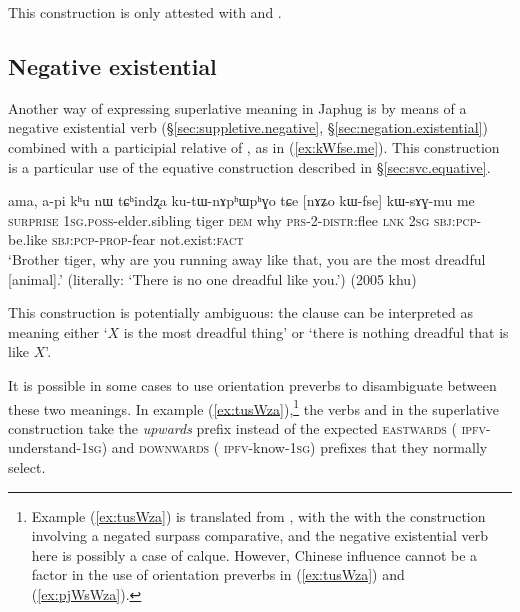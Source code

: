 This construction is only attested with  and .

 \subsection{Negative existential} \label{sec:negative.existential.superlative}
 
Another way of expressing superlative meaning in Japhug is by means of a negative existential verb (§\ref{sec:suppletive.negative}, §\ref{sec:negation.existential}) combined with a participial relative of , as in (\ref{ex:kWfse.me}). This construction is a particular use of the equative construction described in §\ref{sec:svc.equative}.


 \begin{exe}
\ex \label{ex:kWfse.me}
\gll ama, a-pi kʰu nɯ tɕʰindʐa ku-tɯ-nɤpʰɯpʰɣo tɕe [nɤʑo kɯ-fse] kɯ-sɤɣ-mu me	\\
\textsc{surprise} \textsc{1sg}.\textsc{poss}-elder.sibling tiger \textsc{dem} why \textsc{prs}-2-\textsc{distr}:flee \textsc{lnk} \textsc{2sg}  \textsc{sbj}:\textsc{pcp}-be.like   \textsc{sbj}:\textsc{pcp}-\textsc{prop}-fear  not.exist:\textsc{fact} \\
\glt `Brother tiger, why are you running away like that, you are the most dreadful [animal].' (literally: `There is no one dreadful like you.') (2005 khu)
\end{exe}

This construction is potentially ambiguous: the clause  can be interpreted as meaning either  `$X$ is the most dreadful thing' or `there is nothing dreadful that is like $X$'. 

It is possible in some cases to use orientation preverbs to disambiguate between these two meanings. In example (\ref{ex:tusWza}),\footnote{Example  (\ref{ex:tusWza}) is translated from , with the  with the construction  involving a negated surpass comparative, and the negative existential verb here is possibly a case of calque. However, Chinese influence cannot be a factor in the  use of orientation preverbs in (\ref{ex:tusWza}) and (\ref{ex:pjWsWza}). } the verbs  and  in the superlative construction take the \textsl{upwards} prefix  instead of the expected \textsc{eastwards} ( \textsc{ipfv}-understand-\textsc{1sg}) and \textsc{downwards} ( \textsc{ipfv}-know-\textsc{1sg}) prefixes that they normally select.

